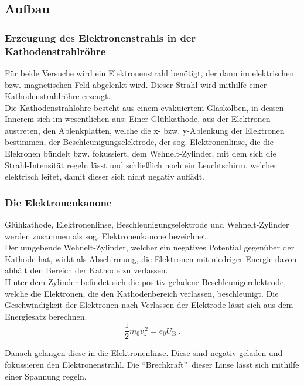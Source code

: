 \subsection{Aufbau}

\subsubsection{Erzeugung des Elektronenstrahls in der Kathodenstrahlröhre}

Für beide Versuche wird ein Elektronenstrahl benötigt, der dann im
elektrischen bzw. magnetischen Feld abgelenkt wird. Dieser Strahl wird
mithilfe einer Kathodenstrahlröhre erzeugt.\\

Die Kathodenstrahlöhre besteht aus einem evakuiertem Glaskolben, in dessen Innerem sich im wesentlichen aus:
Einer Glühkathode, aus der Elektronen austreten, den Ablenkplatten, welche die x- bzw. y-Ablenkung der Elektronen bestimmen, der Beschleunigungselektrode, der sog. Elektronenlinse, die die Elekronen bündelt bzw. fokussiert, dem Wehnelt-Zylinder, mit dem sich die Strahl-Intensität regeln lässt und schließlich noch ein Leuchtschirm, welcher elektrisch leitet, damit dieser sich nicht negativ auflädt.

\subsubsection{Die Elektronenkanone}
Glühkathode, Elektronenlinse, Beschleunigungselektrode und Wehnelt-Zylinder werden zusammen als sog. Elektronenkanone bezeichnet.\\
Der umgebende Wehnelt-Zylinder, welcher ein negatives Potential
gegenüber der Kathode hat, wirkt als Abschirmung, die Elektronen mit
niedriger Energie davon abhält den Bereich der Kathode zu
verlassen.\\
Hinter dem Zylinder befindet sich die positiv geladene
Beschleunigerelektrode, welche die Elektronen, die den Kathodenbereich
verlassen, beschleunigt. Die Geschwindigkeit der Elektronen nach
Verlassen der Elektrode lässt sich aus dem Energiesatz berechnen.
%
\begin{equation}
  \frac{1}{2} m_0 v_z^{\,2} = e_0 U_\text{B} \:.
\end{equation}

Danach gelangen diese in die Elektronenlinse. Diese sind negativ geladen und fokussieren den Elektronenstrahl. Die \textquotedblleft Brechkraft\textquotedblright \, dieser Linse lässt sich mithilfe einer Spannung regeln.

